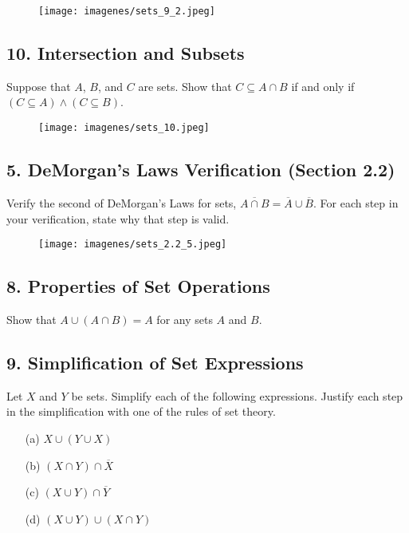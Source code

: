 \documentclass{article}
\begin{document}
\begin{figure}[H]
\centering
\texttt{[image: imagenes/sets\_9\_2.jpeg]}
\end{figure}

\subsection*{10. Intersection and Subsets}

Suppose that $A$, $B$, and $C$ are sets. Show that $C \subseteq A \cap B$ if and only if $(C \subseteq A) \land (C \subseteq B)$. 

\begin{figure}[H]
\centering
\texttt{[image: imagenes/sets\_10.jpeg]}
\end{figure}



\subsection*{5. DeMorgan’s Laws Verification (Section 2.2)}

Verify the second of DeMorgan’s Laws for sets, $\overline{A \cap B} = \overline{A} \cup \overline{B}$. For each step in your verification, state why that step is valid.

\begin{figure}[H]
\centering
\texttt{[image: imagenes/sets\_2.2\_5.jpeg]}
\end{figure}

\subsection*{8. Properties of Set Operations}

Show that $A \cup (A \cap B) = A$ for any sets $A$ and $B$.

\subsection*{9. Simplification of Set Expressions}

Let $X$ and $Y$ be sets. Simplify each of the following expressions. Justify each step in the simplification with one of the rules of set theory.

\begin{enumerate}
    \item[(a)] $X \cup (Y \cup X)$
    \item[(b)] $(X \cap Y) \cap \overline{X}$
    \item[(c)] $(X \cup Y) \cap \overline{Y}$
    \item[(d)] $(X \cup Y) \cup (X \cap Y)$
\end{enumerate}
\end{document}
